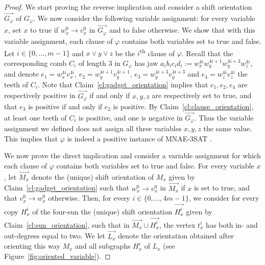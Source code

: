 \documentclass[11pt,a4aper]{article}
\DeclareRobustCommand*{\ora}{\overrightarrow}
\renewcommand{\phi}{\varphi}
\newcommand*{\orGphi}{\ora{G_{\phi}}}
\newcommand*{\orHxi}{\ora{H_x^i}}
\newcommand*{\orLx}{\ora{L_x}}
\newcommand*{\orMx}{\ora{M_x}}
\newcommand*{\MNAE}{\textsc{MNAE-3SAT} }
\begin{document}
\begin{proof}
  We start proving the reverse implication and consider a shift orientation $\orGphi$ of
  $G_\phi$. We now consider the following variable assignment: for every variable $x$, set $x$ to true if $w^{0}_x \to v^0_x$ in $\orGphi$ and
  to false otherwise. We show that with this variable assignment, each clause of $\phi$ contains both variables set to true and false.
  Let $i\in \{0,\ldots,m-1\}$ and $x\lor y\lor z$ be the $i$\textsuperscript{th} clause of $\phi$. 
  Recall that the corresponding comb $C_i$ of length $3$ in $G_{\varphi}$ has
  jaw $a_ib_ic_id_i:=w_x^{4i}w_y^{4i+1}w_y^{4i+3}w_z^{4i}$, and denote $e_1 = w_x^{4i}v_x^{4i}$, $e_2=w_y^{4i+1}v_y^{4i+1}$,
  $e_3=w_y^{4i+3}v_y^{4i+3}$ and $e_4=w_z^{4i}v_z^{4i}$ the teeth of $C_i$.
Note that Claim~\ref{cl:gadget_orientation} implies that $e_1, e_2, e_4$ are
respectively positive in $\orGphi$ if and only if $x,y,z$ are respectively set
to true, and that $e_3$ is positive if and only if $e_2$ is
positive. By Claim~\ref{cl:clause_orientation}, at least one teeth of
$C_i$ is positive, and one is negative in $\orGphi$. Thus the variable assignment we defined does not assign all three variables $x,y,z$ the same value. This implies that $\varphi$ is indeed a positive instance of \MNAE.
  


  We now prove the direct implication and consider a variable assignment for which each clause of $\phi$ contains both variables set to true and false.
  For
  every variable $x$, let $\orMx$ denote the (unique) shift orientation of $M_x$ given by Claim~\ref{cl:gadget_orientation} such that
  $w^{0}_x \to v^{0}_x$ in $\orMx$ if $x$ is set to true, and that $v^0_x\to w^0_x$ otherwise.
  Then, for every $i\in \{0,\ldots,4m-1\}$, we consider for every copy $H^i_x$
  of the four-sun the (unique) shift orientation $\orHxi$ given by
  Claim~\ref{cl:sun_orientation}, such that in  $\orMx\cup\orHxi$, the vertex
  $t^{i}_x$ has both in- and out-degrees equal to two. We let $\orLx$ denote the
  orientation obtained after orienting this way $M_x$ and all subgraphs $H_x^i$
  of $L_x$ (see Figure~\ref{fig:oriented_variable}).


\end{proof}
\end{document}
